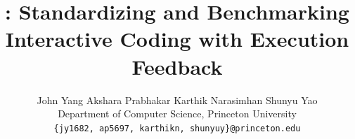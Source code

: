 \documentclass{article}
\title{\benchmark: Standardizing and Benchmarking Interactive Coding with Execution Feedback}
\author{%
  John Yang \quad Akshara Prabhakar \quad Karthik Narasimhan \quad Shunyu Yao\\
  Department of Computer Science, Princeton University\\
  \texttt{\{jy1682, ap5697, karthikn, shunyuy\}@princeton.edu}
}
\begin{document}
\maketitle

\renewcommand{\thefootnote}{\fnsymbol{footnote}}






% 



\newpage



% 
\newpage
\appendix



\end{document}
